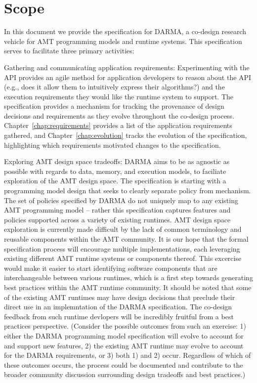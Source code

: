 \section{Scope}\label{sec:scope}
In this document we provide the specification for DARMA,
a co-design research vehicle for \gls{AMT} programming models and runtime
systems.  This specification serves to facilitate three primary activities: 
\begin{compactdesc}
\item[Gathering and communicating application requirements:]
Experimenting with the \gls{API} provides an agile method for application
developers to reason about the \gls{API} (e.g., does it allow them to intuitively
    express their algorithms?) and the execution requirements they would like
the runtime system to support.
The specification provides a mechanism for tracking the
provenance of design decisions and requirements as they evolve throughout the co-design
process. Chapter~\ref{chap:requirements} provides a list of the application
requirements gathered,  and
Chapter~\ref{chap:evolution} tracks the evolution of
the specification, highlighting which requirements
motivated changes to the specification.
\item[Exploring AMT design space tradeoffs:]
DARMA aims to be as agnostic as possible with regards to data, memory, and execution
models, to faciliate exploration of the AMT design space. The specification is
starting with a programming model design that seeks to clearly separate policy
from mechanism.  The set of policies specified by DARMA do not uniquely map to any
existing AMT programming model -- rather this specification captures features and policies
supported across a variety of existing runtimes.
\gls{AMT} design space exploration is currently made difficult by the lack of
common terminology and reusable components within the \gls{AMT} community.  It
is our hope that the formal specification process will encourage multiple
implementations, each leveraging
existing different \gls{AMT} runtime systems or components thereof.  
This excercise would make it easier to start identifying 
software components that are interchangeable between various runtimes, which is a first
step towards generating best practices within the \gls{AMT} runtime community.
It should be noted that some of the existing \gls{AMT} runtimes 
may have design decisions that preclude their direct use in an implemntation of the
DARMA specification. The co-design feedback from such runtime devlopers 
will be incredibly fruitful from a best practices perspective. (Consider 
the possible outcomes from such an exercise: 1) either the DARMA 
programming model specification will evolve to account for and support new
features, 2) the existing \gls{AMT} runtime may evolve to account for the DARMA
requirements, or 3) both 1) and 2) occur.  Regardless of which of these
outcomes occurs, the process could be documented and contribute to the
broader community discussion surrounding design tradeoffs and best practices.) 


\end{compactdesc}
